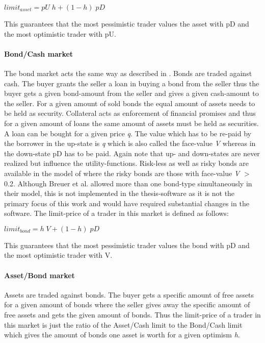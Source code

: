\documentclass[../Bachelorarbeit.tex]{subfiles}
\begin{document}
\begin{center}
$limit_{asset} = pU \; h + ( 1 - h ) \; pD$
\end{center}

This guarantees that the most pessimistic trader values the asset with pD and the most optimistic trader with pU.

\paragraph{Bond/Cash market}
The bond market acts the same way as described in \cite{Geanakoplos2009}. Bonds are traded against cash. The buyer grants the seller a loan in buying a bond from the seller thus the buyer gets a given bond-amount from the seller and gives a given cash-amount to the seller. For a given amount of sold bonds the equal amount of assets needs to be held as security. Collateral acts as enforcement of financial promises and thus for a given amount of loans the same amount of assets must be held as securities. A loan can be bought for a given price \textit{q}. The value which has to be re-paid by the borrower in the up-state is \textit{q} which is also called the face-value \textit{V} whereas in the down-state pD has to be paid. Again note that up- and down-states are never realized but influence the utility-functions.
\medskip
Risk-less as well as risky bonds are available in the model of \cite{Breuer2015} where the risky bonds are those with face-value \textit{V} $>$ 0.2. Although Breuer et al. allowed more than one bond-type simultaneously in their model, this is not implemented in the thesis-software as it is not the primary focus of this work and would have required substantial changes in the software.
\medskip
The limit-price of a trader in this market is defined as follows:

\begin{center}
$limit_{bond} = h \; V + ( 1 - h ) \; pD$
\end{center}

This guarantees that the most pessimistic trader values the bond with pD and the most optimistic trader with V.

\paragraph{Asset/Bond market}
Assets are traded against bonds. The buyer gets a specific amount of free assets for a given amount of bonds where the seller gives away the specific amount of free assets and gets the given amount of bonds. Thus the limit-price of a trader in this market is just the ratio of the Asset/Cash limit to the Bond/Cash limit which gives the amount of bonds one asset is worth for a given optimism \textit{h}.
\end{document}
